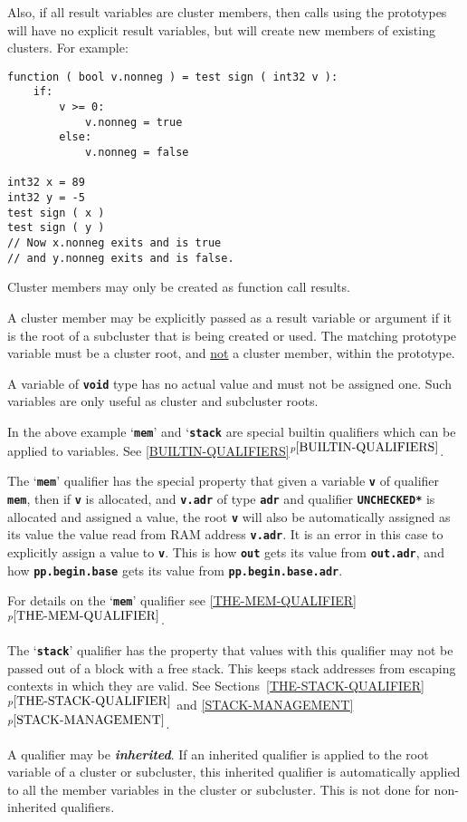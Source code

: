 \documentclass[12pt]{article}
\newcommand{\TT}[1]{{\tt \bfseries #1}}
\newcommand{\ikey}[2]{{\bf \em #1}\index{#2}}
\newcommand{\itemref}[1]{\ref{#1}$^{p\pageref{#1}}$}
\newenvironment{indpar}[1][0.3in]%
	{\begin{list}{}%
		     {\setlength{\itemsep}{0in}%
		      \setlength{\topsep}{0in}%
		      \setlength{\parsep}{1ex}%
		      \setlength{\labelwidth}{#1}%
		      \setlength{\leftmargin}{#1}%
		      \addtolength{\leftmargin}{\labelsep}}%
	 \item}%
	{\end{list}}
\begin{document}
Also, if all result variables are cluster members, then calls
using the prototypes will have no explicit result variables,
but will create new members of existing clusters.  For example:
\begin{indpar}\begin{verbatim}
function ( bool v.nonneg ) = test sign ( int32 v ):
    if:
        v >= 0:
            v.nonneg = true
        else:
            v.nonneg = false

int32 x = 89
int32 y = -5
test sign ( x )
test sign ( y )
// Now x.nonneg exits and is true
// and y.nonneg exits and is false.
\end{verbatim}\end{indpar}

Cluster members may only be created as function call results.

A cluster member may be explicitly passed as a result variable
or argument if it is the root of a subcluster that is being
created or used.  The matching prototype variable must
be a cluster root, and \underline{not} a cluster member,
within the prototype.

A variable of \TT{void} type has no actual value
and must not be assigned one.  Such variables are only useful
as cluster and subcluster roots.

In the above example `\TT{mem}' and `\TT{stack} are special builtin qualifiers
which can be applied to variables.
See \itemref{BUILTIN-QUALIFIERS}.

The `\TT{mem}' qualifier\label{MEM}
has the special property that given a variable
\TT{v} of qualifier \TT{mem}, then if \TT{v} is allocated,
and \TT{v.adr} of type \TT{adr} and qualifier \TT{*UNCHECKED*}
is allocated and
assigned a value, the root \TT{v} will also be automatically
assigned as its value the value read from RAM address \TT{v.adr}.
It is an error in this case to explicitly assign a value to \TT{v}.
This is how \TT{out} gets its value from
\TT{out.adr}, and how \TT{pp.begin.base} gets its value from
\TT{pp.begin.base.adr}.

For details on the `\TT{mem}' qualifier see \itemref{THE-MEM-QUALIFIER}.

The `\TT{stack}' qualifier has the property that values with
this qualifier may not be passed out of a block with a free
stack.  This keeps stack addresses from escaping contexts in
which they are valid.  See Sections~\itemref{THE-STACK-QUALIFIER} and
\itemref{STACK-MANAGEMENT}.

A qualifier may be \ikey{inherited}{qualifier}\label{INHERITED-QUALIFIER}.
If an inherited qualifier
is applied to the root variable of a cluster
or subcluster, this inherited qualifier is automatically applied to all
the member variables in the cluster or subcluster.  This is not done
for non-inherited qualifiers.
\end{document}
